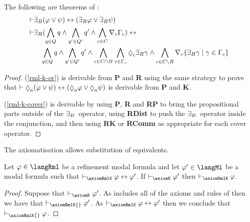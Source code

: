 \begin{lemma}\label{rml-k-theorems}
The following are theorems of \axiomRmlK{}:
\begin{align}
    \proves & \somerefsBs (\phi \lor \psi) \iff (\somerefsBs \phi \lor \somerefsBs \psi) \label{rml-k-or}\\
    \proves & \displaystyle \somerefsBs (\bigwedge_{\atomQ \in \atomsQ} \atomQ \land \bigwedge_{\atomQ' \in \atomsQ'} \atomQ' \land \bigwedge_{\agentC \in \agentsC} \coverC \Gamma_\agentC) \iff \nonumber\\
            & \displaystyle \quad
            \bigwedge_{\atomQ \in \atomsQ} \atomQ \land \bigwedge_{\atomQ' \in \atomsQ'} \atomQ' \land 
            \bigwedge_{\agentC \in \agentsC \cap \agentsB} \bigwedge_{\gamma \in \Gamma_\agentC} \possibleC \somerefsBs \gamma \land
            \bigwedge_{\agentC \in \agentsC \setminus \agentsB} \coversC \{\somerefsBs \gamma \mid \gamma \in \Gamma_\agentC\} \label{rml-k-cover}
\end{align}
\end{lemma}

\begin{proof}
    (\ref{rml-k-or}) is derivable from {\bf P} and {\bf R} using the same strategy to prove that $\proves \possibleA (\phi \lor \psi) \iff (\possibleA \phi \lor \possibleA \psi)$ is derivable from {\bf P} and {\bf K}.

    (\ref{rml-k-cover}) is derivable by using {\bf P}, {\bf R} and {\bf RP} to bring the propositional parts outside of the ${\exists_{B}}$~operator,
    using {\bf RDist} to push the ${\exists_{B}}$~operator inside the conjunction,
    and then using {\bf RK} or {\bf RComm} as appropriate for each cover operator.
\end{proof}

\begin{lemma}\label{rml-k-substitution-equivalents}
The axiomatisation \axiomRmlK{} allows substitution of equivalents.
\end{lemma}


\begin{lemma}\label{rml-k-ml-provability}
Let $\phi \in \langRml$ be a refinement modal formula and let $\phi' \in \langMl$ be a modal formula such that $\proves_\axiomRmlK \phi \iff \phi'$.
If $\proves_\axiomK \phi'$ then $\proves_\axiomRmlK \phi$.
\end{lemma}

\begin{proof}
Suppose that $\proves_\axiomK \phi'$.
As \axiomRmlK{} includes all of the axioms and rules of \axiomK{} then we have that $\proves_\axiomRmlK{} \phi'$.
As $\proves_\axiomRmlK \phi \iff \phi'$ then we conclude that $\proves_\axiomRmlK{} \phi$.
\end{proof}

